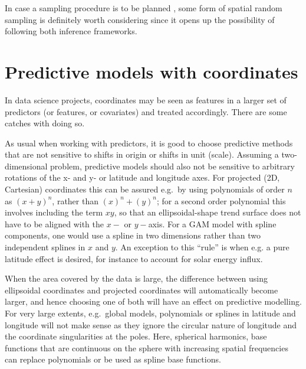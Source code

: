 \documentclass[]{book}
\begin{document}
In case a sampling procedure is to be planned \citep{de2006sampling}, some
form of spatial random sampling is definitely worth considering since
it opens up the possibility of following both inference frameworks.

\hypertarget{predictive-models-with-coordinates}{%
\section{Predictive models with coordinates}\label{predictive-models-with-coordinates}}

In data science projects, coordinates may be seen as features in a
larger set of predictors (or features, or covariates) and treated
accordingly. There are some catches with doing so.

As usual when working with predictors, it is good to choose
predictive methods that are not sensitive to shifts in origin
or shifts in unit (scale). Assuming a two-dimensional problem,
predictive models should also not be sensitive to arbitrary rotations
of the x- and y- or latitude and longitude axes. For projected (2D,
Cartesian) coordinates this can be assured e.g.~by using polynomials
of order \(n\) as \((x+y)^n\), rather than \((x)^n + (y)^n\); for a second
order polynomial this involves including the term \(xy\), so that an
ellipsoidal-shape trend surface does not have to be aligned with
the \(x-\) or \(y-\)axis. For a GAM model with spline components, one
would use a spline in two dimensions rather than two independent
splines in \(x\) and \(y\). An exception to this ``rule'' is when e.g.
a pure latitude effect is desired, for instance to account for
solar energy influx.

When the area covered by the data is large, the difference between
using ellipsoidal coordinates and projected coordinates
will automatically become larger, and hence choosing one of both
will have an effect on predictive modelling. For very large extents,
e.g.~global models, polynomials or splines in latitude and longitude
will not make sense as they ignore the circular nature of longitude
and the coordinate singularities at the poles. Here, spherical
harmonics, base functions that are continuous on the sphere with
increasing spatial frequencies can replace polynomials or be used
as spline base functions.
\end{document}
